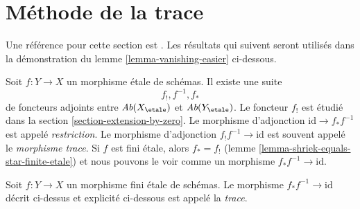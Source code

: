 \section{M\'ethode de la trace}
\label{section-trace-method}

\noindent
Une r\'ef\'erence pour cette section est \cite[Expos\'e IX, \S 5]{SGA4}.
Les r\'esultats qui suivent seront utilis\'es dans la d\'emonstration du
lemme \ref{lemma-vanishing-easier} ci-dessous.

\medskip\noindent
Soit $f : Y \to X$ un morphisme \'etale de sch\'emas. Il existe
une suite
$$
f_!, f^{-1}, f_*
$$
de foncteurs adjoints entre
$\textit{Ab}(X_\etale)$ et $\textit{Ab}(Y_\etale)$.
Le foncteur $f_!$ est \'etudi\'e dans la section \ref{section-extension-by-zero}.
Le morphisme d'adjonction $\text{id} \to f_* f^{-1}$ est appel\'e {\it restriction}.
Le morphisme d'adjonction $f_! f^{-1} \to \text{id}$ est souvent
appel\'e le {\it morphisme trace}. Si $f$ est fini \'etale, alors $f_* = f_!$
(lemme \ref{lemma-shriek-equals-star-finite-etale}) et
nous pouvons le voir comme un morphisme $f_*f^{-1} \to \text{id}$.

\begin{definition}
\label{definition-trace-map}
Soit $f : Y \to X$ un morphisme fini \'etale de sch\'emas.
Le morphisme $f_* f^{-1} \to \text{id}$ d\'ecrit ci-dessus et explicit\'e ci-dessous
est appel\'e la {\it trace}.
\end{definition}

